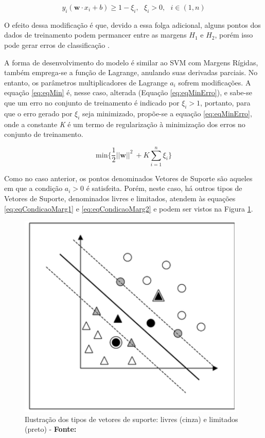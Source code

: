 \begin{equation}
\label{eq:eqSuave}
 y_i(\boldsymbol{w} \cdot x_i + b) \geq 1 - \xi_i, \text{ } \xi_i > 0, \text{ } i \in (1,n)
\end{equation}

O efeito dessa modificação é que, devido a essa folga adicional, alguns pontos dos dados de treinamento podem permancer entre as margens $H_1$ e $H_2$, porém isso pode gerar erros de classificação .

A forma de desenvolvimento do modelo é similar ao SVM com Margens Rígidas, também emprega-se a função de Lagrange, anulando suas derivadas parciais. No entanto, os parâmetros multiplicadores de Lagrange $a_i$ sofrem modificações. A equação \ref{eq:eqMin} é, nesse caso, alterada (Equação \ref{eq:eqMinErro}), e sabe-se que um erro no conjunto de treinamento é indicado por $\xi_i > 1$, portanto, para que o erro gerado por $\xi_i$ seja minimizado, propõe-se a equação \ref{eq:eqMinErro}, onde a constante \textit{K} é um termo de regularização à minimização dos erros no conjunto de treinamento.

\begin{equation}
\label{eq:eqMinErro}
  \text{min}\{\frac{1}{2}||\boldsymbol{w}||^2\ + K\displaystyle\sum_{i=1}^{n}\xi_i\}
\end{equation}

Como no caso anterior, os pontos denominados Vetores de Suporte são aqueles em que a condição $a_i > 0$ é satisfeita. Porém, neste caso, há outros tipos de Vetores de Suporte, denominados livres e limitados, atendem às equações \ref{eq:eqCondicaoMarg1} e \ref{eq:eqCondicaoMarg2} e podem ser vistos na Figura \ref{fig:margemSuave}.

\begin{figure}[H]
 \centering
  \includegraphics[width=0.4\linewidth]{figuras/margemSuave.pdf}
  \caption{Ilustração dos tipos de vetores de suporte: livres (cinza) e limitados (preto) - \textbf{Fonte:} }
  \label{fig:margemSuave}
\end{figure}

